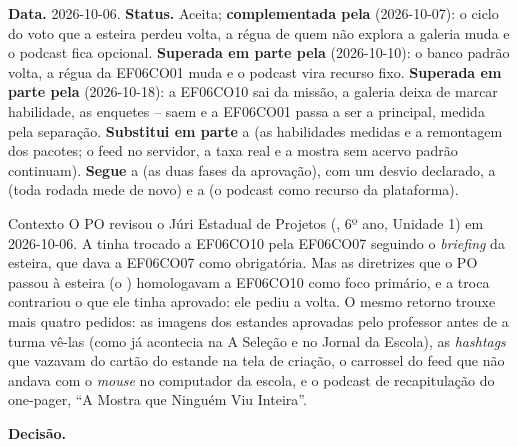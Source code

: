 \textbf{Data.} 2026-10-06. \textbf{Status.} Aceita; \textbf{complementada
pela } (2026-10-07): o ciclo do voto que a esteira perdeu
volta, a régua de quem não explora a galeria muda e o podcast fica opcional.
\textbf{Superada em parte pela } (2026-10-10): o banco padrão
volta, a régua da EF06CO01 muda e o podcast vira recurso fixo.
\textbf{Superada em parte pela } (2026-10-18): a EF06CO10 sai
da missão, a galeria deixa de marcar habilidade, as enquetes --
saem e a EF06CO01 passa a ser a principal, medida pela separação.
\textbf{Substitui em
parte} a  (as habilidades medidas e a remontagem dos pacotes;
o feed no servidor, a taxa real e a mostra sem acervo padrão continuam).
\textbf{Segue} a  (as duas fases da aprovação), com um desvio
declarado, a  (toda rodada mede de novo) e a  (o
podcast como recurso da plataforma).

\begin{especificacao}{Contexto}
O PO revisou o Júri Estadual de Projetos (, 6º ano, Unidade 1)
em 2026-10-06. A  tinha trocado a EF06CO10 pela EF06CO07
seguindo o \emph{briefing} da esteira, que dava a EF06CO07 como obrigatória.
Mas as diretrizes que o PO passou à esteira (o ) homologavam
a EF06CO10 como foco primário, e a troca contrariou o que ele tinha aprovado:
ele pediu a volta. O mesmo retorno trouxe mais quatro pedidos: as imagens dos
estandes aprovadas pelo professor antes de a turma vê-las (como já acontecia
na A Seleção e no Jornal da Escola), as \emph{hashtags} que vazavam do cartão
do estande na tela de criação, o carrossel do feed que não andava com o
\emph{mouse} no computador da escola, e o podcast de recapitulação do
one-pager, \enquote{A Mostra que Ninguém Viu Inteira}.
\end{especificacao}

\textbf{Decisão.}


